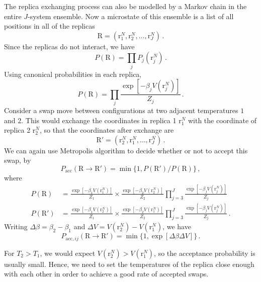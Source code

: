 \documentclass{article}
\theoremstyle{plain}\theoremheaderfont{\normalfont\itshape}\theorembodyfont{\rmfamily}\theoremseparator{.}\newtheorem*{rem}{Remark}\newtheorem*{ex}{Example}\newtheorem*{proof}{Proof}\newtheorem*{altp}{Alternative proof}
\theoremstyle{plain}\theoremheaderfont{\normalfont\bfseries}\theorembodyfont{\rmfamily}\theoremseparator{.}\newtheorem{thm}{Theorem}[section]\newtheorem{lem}[thm]{Lemma}\newtheorem{prop}[thm]{Proposition}\newtheorem*{cor}{Corollary}\newtheorem{defn}[thm]{Definition}\newtheorem{clm}[thm]{Claim}\newtheorem{clminproof}{Claim}\newtheorem{alg}[thm]{Algorithm}\newtheorem{hyp}[thm]{Hypothesis}\newtheorem{law}[thm]{Law}
\theoremstyle{break}\theoremheaderfont{\normalfont\itshape}\theorembodyfont{\rmfamily}\theoremseparator{.\medskip}\newtheorem*{proofskip}{Proof}\newtheorem*{exs}{Examples}\newtheorem*{rems}{Remarks}
\theoremstyle{break}\theoremheaderfont{\normalfont\bfseries}\theorembodyfont{\rmfamily}\theoremseparator{.\medskip}\newtheorem{lemskip}[thm]{Lemma}\newtheorem{defnskip}[thm]{Definition}\newtheorem{propskip}[thm]{Proposition}\newtheorem{thmskip}[thm]{Theorem}
\numberwithin{equation}{section}
\newcommand{\vb}[1]{\bm{\mathrm{#1}}}
\begin{document}
    The replica exchanging process can also be modelled by a Markov chain in the entire \(J\)-system ensemble. Now a microstate of this ensemble is a list of all positions in all of the replicas
    \begin{equation}
        \vb{R}=(\vb{r}_1^N,\vb{r}_2^N,\dots,\vb{r}_J^N)\,.
    \end{equation}
    Since the replicas do not interact, we have
    \begin{equation}
        P(\vb{R})=\prod_j P_j(\vb{r}_j^N)\,.
    \end{equation}
    Using canonical probabilities in each replica,
    \begin{equation}
        P(\vb{R})=\prod_j \frac{\exp[-\beta_j V(\vb{r}_j^N)]}{Z_j}\,.
    \end{equation}
    Consider a swap move between configurations at two adjacent temperatures \(1\) and \(2\). This would exchange the coordinates in replica 1 \(\vb{r}_1^N\) with the coordinate of replica 2 \(\vb{r}_2^N\), so that the coordinates after exchange are
    \begin{equation}
        \vb{R}'=(\vb{r}_2^N,\vb{r}_1^N,\dots,\vb{r}_J^N)\,.
    \end{equation}
    We can again use Metropolis algorithm to decide whether or not to accept this swap, by
    \begin{equation}
        P_{\text{acc}}(\vb{R}\to\vb{R}')=\min\{1,P(\vb{R}')/P(\vb{R})\}\,,
    \end{equation}
    where
    \begin{align}
        P(\vb{R})&=\frac{\exp[-\beta_1V(\vb{r}_1^N)]}{Z_1}\times\frac{\exp[-\beta_2 V(\vb{r}_2^N)]}{Z_2}\prod_{j=3}^{J}\frac{\exp[-\beta_jV(\vb{r}_j^N)]}{Z_j}\\
        P(\vb{R}')&=\frac{\exp[-\beta_1V(\vb{r}_2^N)]}{Z_1}\times\frac{\exp[-\beta_2 V(\vb{r}_1^N)]}{Z_2}\prod_{j=3}^{J}\frac{\exp[-\beta_jV(\vb{r}_j^N)]}{Z_j}\,.
    \end{align}
    Writing \(\Delta\beta=\beta_2-\beta_1\) and \(\Delta V=V(\vb{r}_2^N)-V(\vb{r}_1^N)\), we have
    \begin{equation}
        P_{\text{acc}, ij}(\vb{R}\to\vb{R}')=\min\{1,\exp[\Delta\beta\Delta V]\}\,.
    \end{equation}

    For \(T_2>T_1\), we would expect \(V(\vb{r}_2^N)>V(\vb{r}_1^N)\), so the acceptance probability is usually small. Hence, we need to set the temperatures of the replica close enough with each other in order to achieve a good rate of accepted swaps.
\end{document}
